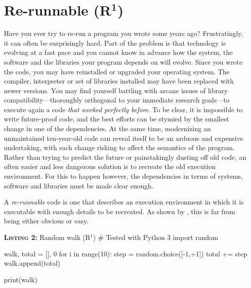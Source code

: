 \documentclass[a4paper,11pt]{article}
\begin{document}
\section*{Re-runnable (R$^{\mathbf 1}$)}

Have you ever try to re-run a program you wrote some years ago?  Frustratingly,
it can often be surprisingly hard.  Part of the problem is that technology is
evolving at a fast pace and you cannot know in advance how the system, the
software and the libraries your program depends on will evolve.  Since you
wrote the code, you may have reinstalled or upgraded your operating system.
The compiler, interpreter or set of libraries installed may have been replaced
with newer versions.  You may find yourself battling with arcane issues of
library compatibility---thoroughly orthogonal to your immediate research
goals---to execute again a code \emph{that worked perfectly before}.  To be
clear, it is impossible to write future-proof code, and the best efforts can be
stymied by the smallest change in one of the dependencies.  At the same time,
modernizing an unmaintained ten-year-old code can reveal itself to be an
arduous and expensive undertaking, with each change risking to affect the
semantics of the program. Rather than trying to predict the future or painstakingly
dusting off old code, an often easier and less dangerous solution is to
recreate the old execution environment.  For this to happen however, the
dependencies in terms of systems, software and libraries must be made clear
enough.

A \emph{re-runnable} code is one that describes an execution environment in
which it is executable with enough details to be recreated.  As shown by
\citep{Collberg:2016}, this is far from being either obvious or easy.

% 
% 
%
\begin{code}{\textbf{\textsc{Listing 2:}} Random walk (R$^1$)}
# Tested with Python 3
import random

walk, total = [], 0
for i in range(10):
    step = random.choice([-1,+1])     
    total += step
    walk.append(total)
    
print(walk)
\end{code}
\end{document}
